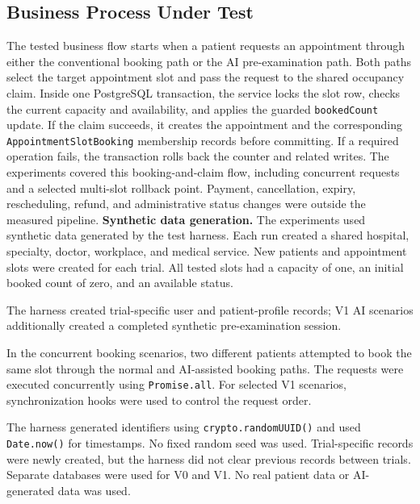 \documentclass[conference]{IEEEtran}
\begin{document}
\subsection{Business Process Under Test}
The tested business flow starts when a patient requests an appointment through either the conventional booking path or the AI pre-examination path. Both paths select the target appointment slot and pass the request to the shared occupancy claim. Inside one PostgreSQL transaction, the service locks the slot row, checks the current capacity and availability, and applies the guarded \texttt{bookedCount} update. If the claim succeeds, it creates the appointment and the corresponding \texttt{AppointmentSlotBooking} membership records before committing. If a required operation fails, the transaction rolls back the counter and related writes. The experiments covered this booking-and-claim flow, including concurrent requests and a selected multi-slot rollback point. Payment, cancellation, expiry, rescheduling, refund, and administrative status changes were outside the measured pipeline.
\textbf{Synthetic data generation.} The experiments used synthetic data generated by the test harness. Each run created a shared hospital, specialty, doctor, workplace, and medical service. New patients and appointment slots were created for each trial. All tested slots had a capacity of one, an initial booked count of zero, and an available status.

The harness created trial-specific user and patient-profile records; V1 AI scenarios additionally created a completed synthetic pre-examination session.

In the concurrent booking scenarios, two different patients attempted to book the same slot through the normal and AI-assisted booking paths. The requests were executed concurrently using \texttt{Promise.all}. For selected V1 scenarios, synchronization hooks were used to control the request order.

The harness generated identifiers using \texttt{crypto.randomUUID()} and used \texttt{Date.now()} for timestamps. No fixed random seed was used. Trial-specific records were newly created, but the harness did not clear previous records between trials. Separate databases were used for V0 and V1. No real patient data or AI-generated data was used.
\end{document}
